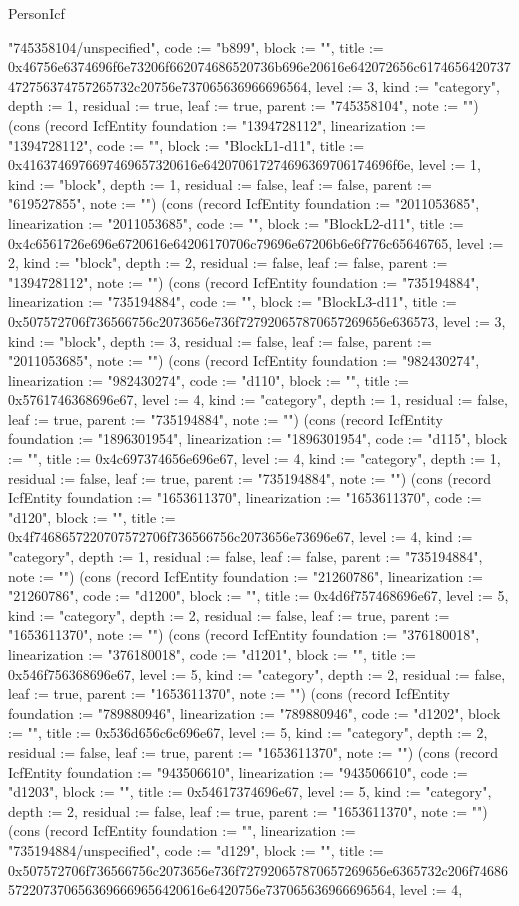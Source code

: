 \begin{lexlean}{PersonIcf}
\begin{semanticmodule}
{"745358104/unspecified", code := "b899", block := "", title := 0x46756e6374696f6e73206f662074686520736b696e20616e642072656c6174656420737472756374757265732c20756e737065636966696564, level := 3, kind := "category", depth := 1, residual := true, leaf := true, parent := "745358104", note := ""}) (cons (record IcfEntity {foundation := "1394728112", linearization := "1394728112", code := "", block := "BlockL1-d11", title := 0x4163746976697469657320616e642070617274696369706174696f6e, level := 1, kind := "block", depth := 1, residual := false, leaf := false, parent := "619527855", note := ""}) (cons (record IcfEntity {foundation := "2011053685", linearization := "2011053685", code := "", block := "BlockL2-d11", title := 0x4c6561726e696e6720616e64206170706c79696e67206b6e6f776c65646765, level := 2, kind := "block", depth := 2, residual := false, leaf := false, parent := "1394728112", note := ""}) (cons (record IcfEntity {foundation := "735194884", linearization := "735194884", code := "", block := "BlockL3-d11", title := 0x507572706f736566756c2073656e736f727920657870657269656e636573, level := 3, kind := "block", depth := 3, residual := false, leaf := false, parent := "2011053685", note := ""}) (cons (record IcfEntity {foundation := "982430274", linearization := "982430274", code := "d110", block := "", title := 0x5761746368696e67, level := 4, kind := "category", depth := 1, residual := false, leaf := true, parent := "735194884", note := ""}) (cons (record IcfEntity {foundation := "1896301954", linearization := "1896301954", code := "d115", block := "", title := 0x4c697374656e696e67, level := 4, kind := "category", depth := 1, residual := false, leaf := true, parent := "735194884", note := ""}) (cons (record IcfEntity {foundation := "1653611370", linearization := "1653611370", code := "d120", block := "", title := 0x4f7468657220707572706f736566756c2073656e73696e67, level := 4, kind := "category", depth := 1, residual := false, leaf := false, parent := "735194884", note := ""}) (cons (record IcfEntity {foundation := "21260786", linearization := "21260786", code := "d1200", block := "", title := 0x4d6f757468696e67, level := 5, kind := "category", depth := 2, residual := false, leaf := true, parent := "1653611370", note := ""}) (cons (record IcfEntity {foundation := "376180018", linearization := "376180018", code := "d1201", block := "", title := 0x546f756368696e67, level := 5, kind := "category", depth := 2, residual := false, leaf := true, parent := "1653611370", note := ""}) (cons (record IcfEntity {foundation := "789880946", linearization := "789880946", code := "d1202", block := "", title := 0x536d656c6c696e67, level := 5, kind := "category", depth := 2, residual := false, leaf := true, parent := "1653611370", note := ""}) (cons (record IcfEntity {foundation := "943506610", linearization := "943506610", code := "d1203", block := "", title := 0x54617374696e67, level := 5, kind := "category", depth := 2, residual := false, leaf := true, parent := "1653611370", note := ""}) (cons (record IcfEntity {foundation := "", linearization := "735194884/unspecified", code := "d129", block := "", title := 0x507572706f736566756c2073656e736f727920657870657269656e6365732c206f746865722073706563696669656420616e6420756e737065636966696564, level := 4, }
\end{semanticmodule}
\end{lexlean}

